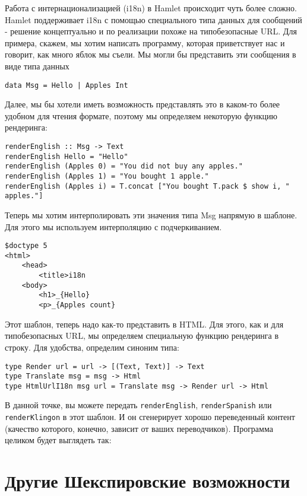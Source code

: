 Работа с интернационализацией (i18n) в Hamlet происходит чуть более
сложно.  Hamlet поддерживает i18n с помощью специального типа данных
для сообщений - решение концептуально и по реализации похоже на типобезопасные
URL. Для примера, скажем, мы хотим написать программу, которая приветствует нас
и говорит, как много яблок мы съели. Мы могли бы представить эти сообщения в
виде типа данных

\begin{lstlisting}
data Msg = Hello | Apples Int
\end{lstlisting}

Далее, мы бы хотели иметь возможность представлять это в каком-то более удобном
для чтения формате, поэтому мы определяем некоторую функцию рендеринга:
\begin{lstlisting}
renderEnglish :: Msg -> Text
renderEnglish Hello = "Hello"
renderEnglish (Apples 0) = "You did not buy any apples."
renderEnglish (Apples 1) = "You bought 1 apple."
renderEnglish (Apples i) = T.concat ["You bought T.pack $ show i, " apples."]
\end{lstlisting}

Теперь мы хотим интерполировать эти значения типа Msg напрямую в шаблоне.  Для
этого мы используем интерполяцию с подчеркиванием.

\begin{lstlisting}
$doctype 5
<html>
    <head>
        <title>i18n
    <body>
        <h1>_{Hello}
        <p>_{Apples count}
\end{lstlisting}

Этот шаблон, теперь надо как-то представить в HTML.  Для этого, как и
для типобезопасных URL, мы определяем специальную функцию рендеринга в строку.
Для удобства, определим синоним типа:

\begin{lstlisting}
type Render url = url -> [(Text, Text)] -> Text
type Translate msg = msg -> Html
type HtmlUrlI18n msg url = Translate msg -> Render url -> Html
\end{lstlisting}

В данной точке, вы можете передать \lstinline!renderEnglish!,
\lstinline!renderSpanish! или \lstinline!renderKlingon! в этот шаблон. И он
сгенерирует хорошо переведенный контент (качество которого, конечно, зависит от
ваших переводчиков). Программа целиком будет выглядеть так:

\section{Другие Шекспировские возможности}

